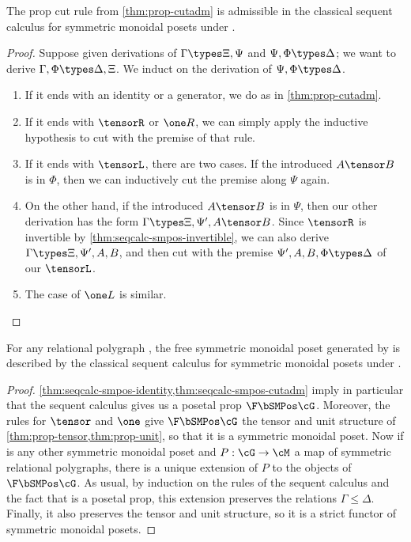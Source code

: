 \begin{thm}\label{thm:seqcalc-smpos-cutadm}
  The prop cut rule from \cref{thm:prop-cutadm} is admissible in the classical sequent calculus for symmetric monoidal posets under \cG.
\end{thm}
\begin{proof}
  Suppose given derivations of $\Gamma\types\Xi,\Psi$ and $\Psi,\Phi \types \Delta$; we want to derive $\Gamma,\Phi \types \Delta,\Xi$.
  We induct on the derivation of $\Psi,\Phi \types \Delta$.
  \begin{enumerate}
  \item If it ends with an identity or a generator, we do as in \cref{thm:prop-cutadm}.
  \item If it ends with $\tensorR$ or $\one R$, we can simply apply the inductive hypothesis to cut with the premise of that rule.
  \item If it ends with $\tensorL$, there are two cases.
    If the introduced $A\tensor B$ is in $\Phi$, then we can inductively cut the premise along $\Psi$ again.
  \item On the other hand, if the introduced $A\tensor B$ is in $\Psi$, then our other derivation has the form $\Gamma\types\Xi,\Psi',A\tensor B$.
    Since $\tensorR$ is invertible by \cref{thm:seqcalc-smpos-invertible}, we can also derive $\Gamma\types\Xi,\Psi',A,B$, and then cut with the premise $\Psi',A,B,\Phi \types \Delta$ of our $\tensorL$.
  \item The case of $\one L$ is similar.\qedhere
  \end{enumerate}
\end{proof}

\begin{thm}\label{thm:seqcalc-smpos-initial}
  For any relational polygraph \cG, the free symmetric monoidal poset generated by \cG is described by the classical sequent calculus for symmetric monoidal posets under \cG.
\end{thm}
\begin{proof}
  \cref{thm:seqcalc-smpos-identity,thm:seqcalc-smpos-cutadm} imply in particular that the sequent calculus gives us a posetal prop $\F\bSMPos\cG$.
  Moreover, the rules for $\tensor$ and $\one$ give $\F\bSMPos\cG$ the tensor and unit structure of \cref{thm:prop-tensor,thm:prop-unit}, so that it is a symmetric monoidal poset.
  Now if \cM is any other symmetric monoidal poset and $P:\cG\to\cM$ a map of symmetric relational polygraphs, there is a unique extension of $P$ to the objects of $\F\bSMPos\cG$.
  As usual, by induction on the rules of the sequent calculus and the fact that \cM is a posetal prop, this extension preserves the relations $\Gamma\le\Delta$.
  Finally, it also preserves the tensor and unit structure, so it is a strict functor of symmetric monoidal posets.
\end{proof}


